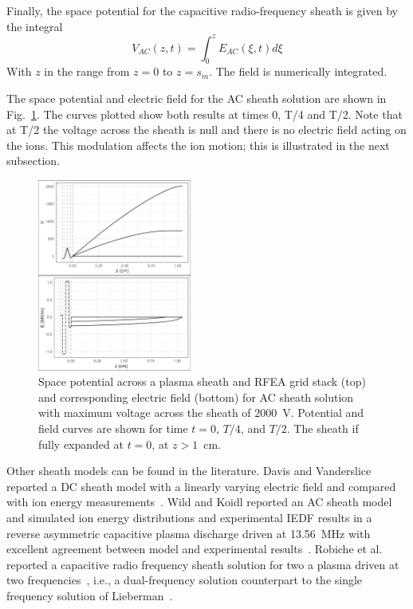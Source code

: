 Finally, the space potential for the capacitive radio-frequency sheath is given by the integral
\begin{equation}
V_{AC}(z,t) = \int_{0}^{z} E_{AC}(\xi, t) d\xi
\end{equation}
With $z$ in the range from $z=0$ to $z=s_m$. The field is numerically integrated.  

The space potential and electric field for the AC sheath solution are shown in Fig.~\ref{fig:ACpotentialField}. The curves plotted show both results at times 0, T/4 and T/2. Note that at T/2 the voltage across the sheath is null and there is no electric field acting on the ions. This modulation affects the ion motion; this is illustrated in the next subsection. 

\begin{figure}[htbp]
\centering
\includegraphics[width=0.45\textwidth]{Figures/VEz2Pa13.56MHz2kVStack2332.jpeg}
\caption{Space potential across a plasma sheath and RFEA grid stack (top) and corresponding electric field (bottom) for AC sheath solution with maximum voltage across the sheath of $2000$~V. Potential and field curves are shown for time $t=0$, $T/4$, and $T/2$. The sheath if fully expanded at $t=0$, at $z>1$~cm.}
\label{fig:ACpotentialField}
\end{figure}


Other sheath models can be found in the literature. Davis and Vanderslice reported a DC sheath model with a linearly varying electric field and compared with ion energy measurements~\cite{Davis1963}. Wild and Koidl reported an AC sheath model and simulated ion energy distributions and experimental IEDF results in a reverse asymmetric capacitive plasma discharge driven at 13.56~MHz with excellent agreement between model and experimental results~\cite{Wild1991}. Robiche et al. reported a capacitive radio frequency sheath solution for two a plasma driven at two frequencies~\cite{Robiche2003}, i.e., a dual-frequency solution counterpart to the single frequency solution of Lieberman~\cite{Lieberman1988}.   







